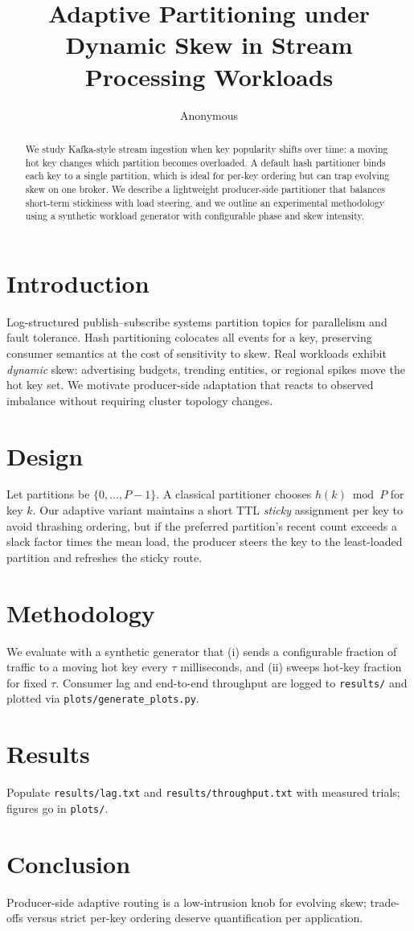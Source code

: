 \documentclass[conference]{IEEEtran}
\title{Adaptive Partitioning under Dynamic Skew in Stream Processing Workloads}
\author{Anonymous}
\date{}
\begin{document}
\maketitle

\begin{abstract}
We study Kafka-style stream ingestion when key popularity shifts over time: a moving hot key changes which partition becomes overloaded. A default hash partitioner binds each key to a single partition, which is ideal for per-key ordering but can trap evolving skew on one broker. We describe a lightweight producer-side partitioner that balances short-term stickiness with load steering, and we outline an experimental methodology using a synthetic workload generator with configurable phase and skew intensity.
\end{abstract}

\section{Introduction}
Log-structured publish--subscribe systems partition topics for parallelism and fault tolerance. Hash partitioning colocates all events for a key, preserving consumer semantics at the cost of sensitivity to skew. Real workloads exhibit \emph{dynamic} skew: advertising budgets, trending entities, or regional spikes move the hot key set. We motivate producer-side adaptation that reacts to observed imbalance without requiring cluster topology changes.

\section{Design}
Let partitions be $\{0,\ldots,P-1\}$. A classical partitioner chooses $h(k) \bmod P$ for key $k$. Our adaptive variant maintains a short TTL \emph{sticky} assignment per key to avoid thrashing ordering, but if the preferred partition's recent count exceeds a slack factor times the mean load, the producer steers the key to the least-loaded partition and refreshes the sticky route.

\section{Methodology}
We evaluate with a synthetic generator that (i) sends a configurable fraction of traffic to a moving hot key every $\tau$ milliseconds, and (ii) sweeps hot-key fraction for fixed $\tau$. Consumer lag and end-to-end throughput are logged to \texttt{results/} and plotted via \texttt{plots/generate\_plots.py}.

\section{Results}
Populate \texttt{results/lag.txt} and \texttt{results/throughput.txt} with measured trials; figures go in \texttt{plots/}.

\section{Conclusion}
Producer-side adaptive routing is a low-intrusion knob for evolving skew; trade-offs versus strict per-key ordering deserve quantification per application.
\end{document}
